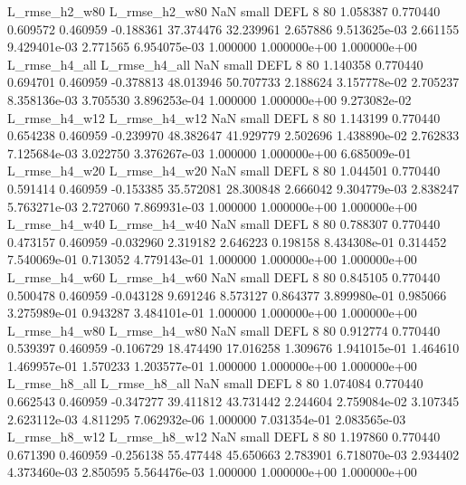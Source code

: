  L_rmse_h2_w80  L_rmse_h2_w80                   NaN      small     DEFL                 8 80 1.058387       0.770440 0.609572       0.460959   -0.188361     37.374476     32.239961     2.657886   9.513625e-03  2.661155 9.429401e-03     2.771565   6.954075e-03            1.000000    1.000000e+00        1.000000e+00
 L_rmse_h4_all  L_rmse_h4_all                   NaN      small     DEFL                 8 80 1.140358       0.770440 0.694701       0.460959   -0.378813     48.013946     50.707733     2.188624   3.157778e-02  2.705237 8.358136e-03     3.705530   3.896253e-04            1.000000    1.000000e+00        9.273082e-02
 L_rmse_h4_w12  L_rmse_h4_w12                   NaN      small     DEFL                 8 80 1.143199       0.770440 0.654238       0.460959   -0.239970     48.382647     41.929779     2.502696   1.438890e-02  2.762833 7.125684e-03     3.022750   3.376267e-03            1.000000    1.000000e+00        6.685009e-01
 L_rmse_h4_w20  L_rmse_h4_w20                   NaN      small     DEFL                 8 80 1.044501       0.770440 0.591414       0.460959   -0.153385     35.572081     28.300848     2.666042   9.304779e-03  2.838247 5.763271e-03     2.727060   7.869931e-03            1.000000    1.000000e+00        1.000000e+00
 L_rmse_h4_w40  L_rmse_h4_w40                   NaN      small     DEFL                 8 80 0.788307       0.770440 0.473157       0.460959   -0.032960      2.319182      2.646223     0.198158   8.434308e-01  0.314452 7.540069e-01     0.713052   4.779143e-01            1.000000    1.000000e+00        1.000000e+00
 L_rmse_h4_w60  L_rmse_h4_w60                   NaN      small     DEFL                 8 80 0.845105       0.770440 0.500478       0.460959   -0.043128      9.691246      8.573127     0.864377   3.899980e-01  0.985066 3.275989e-01     0.943287   3.484101e-01            1.000000    1.000000e+00        1.000000e+00
 L_rmse_h4_w80  L_rmse_h4_w80                   NaN      small     DEFL                 8 80 0.912774       0.770440 0.539397       0.460959   -0.106729     18.474490     17.016258     1.309676   1.941015e-01  1.464610 1.469957e-01     1.570233   1.203577e-01            1.000000    1.000000e+00        1.000000e+00
 L_rmse_h8_all  L_rmse_h8_all                   NaN      small     DEFL                 8 80 1.074084       0.770440 0.662543       0.460959   -0.347277     39.411812     43.731442     2.244604   2.759084e-02  3.107345 2.623112e-03     4.811295   7.062932e-06            1.000000    7.031354e-01        2.083565e-03
 L_rmse_h8_w12  L_rmse_h8_w12                   NaN      small     DEFL                 8 80 1.197860       0.770440 0.671390       0.460959   -0.256138     55.477448     45.650663     2.783901   6.718070e-03  2.934402 4.373460e-03     2.850595   5.564476e-03            1.000000    1.000000e+00        1.000000e+00
